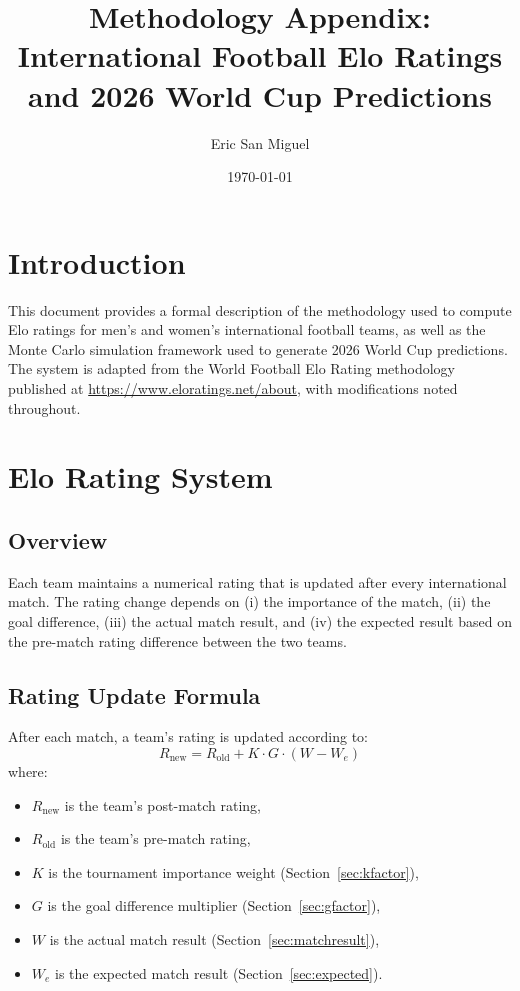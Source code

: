\documentclass[11pt]{article}
\title{Methodology Appendix:\\International Football Elo Ratings\\and 2026 World Cup Predictions}
\author{Eric San Miguel}
\date{\today}
\begin{document}
\maketitle

\tableofcontents
\newpage

\section{Introduction}

This document provides a formal description of the methodology used to compute Elo ratings for men's and women's international football teams, as well as the Monte Carlo simulation framework used to generate 2026 World Cup predictions. The system is adapted from the World Football Elo Rating methodology published at \url{https://www.eloratings.net/about}, with modifications noted throughout.

\section{Elo Rating System}

\subsection{Overview}

Each team maintains a numerical rating that is updated after every international match. The rating change depends on (i) the importance of the match, (ii) the goal difference, (iii) the actual match result, and (iv) the expected result based on the pre-match rating difference between the two teams.

\subsection{Rating Update Formula}

After each match, a team's rating is updated according to:
\begin{equation}
R_{\text{new}} = R_{\text{old}} + K \cdot G \cdot (W - W_e)
\label{eq:elo_update}
\end{equation}
where:
\begin{itemize}[nosep]
    \item $R_{\text{new}}$ is the team's post-match rating,
    \item $R_{\text{old}}$ is the team's pre-match rating,
    \item $K$ is the tournament importance weight (Section~\ref{sec:kfactor}),
    \item $G$ is the goal difference multiplier (Section~\ref{sec:gfactor}),
    \item $W$ is the actual match result (Section~\ref{sec:matchresult}),
    \item $W_e$ is the expected match result (Section~\ref{sec:expected}).
\end{itemize}
\end{document}
